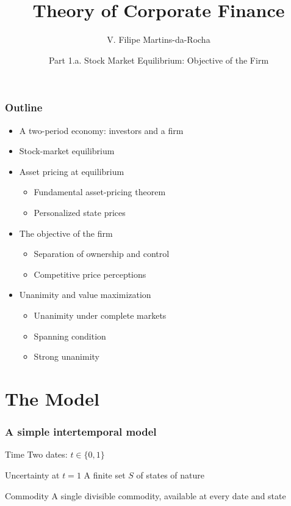 \documentclass[blue]{beamer}
\title[Corporate Finance]{Theory of Corporate Finance}
\author[Victor Filipe]{V. Filipe Martins-da-Rocha}
\institute[FGV EESP]{Escola de Economia de S\~ao Paulo}
\date[April--June, 2026]{Part 1.a. Stock Market Equilibrium: Objective of the Firm}
\theoremstyle{definition}
\theoremstyle{example}
\begin{document}
\frame{\titlepage}

\begin{frame}\frametitle{Outline}
\begin{itemize}
\item A two-period economy: investors and a firm
\item Stock-market equilibrium
\item Asset pricing at equilibrium
    \begin{itemize}
    \item Fundamental asset-pricing theorem
    \item Personalized state prices
    \end{itemize}
\item The objective of the firm
    \begin{itemize}
    \item Separation of ownership and control
    \item Competitive price perceptions
    \end{itemize}
\item Unanimity and value maximization
    \begin{itemize}
    \item Unanimity under complete markets
    \item Spanning condition
    \item Strong unanimity
    \end{itemize}
\end{itemize}
\end{frame}

\section{The Model}

\begin{frame}\frametitle{A simple intertemporal model}
\begin{block}{Time}
Two dates: $t \in \{0, 1\}$
\end{block}
\begin{block}{Uncertainty at $t=1$}
A finite set $S$ of states of nature
\end{block}
\begin{block}{Commodity}
A single divisible commodity, available at every date and state
\end{block}
\end{frame}
\end{document}
